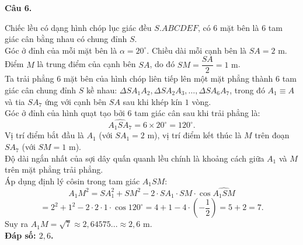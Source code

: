 \documentclass[12pt,a4paper]{article}
\newcommand{\loigiai}[1]{\par\medskip\Needspace{4\baselineskip}\noindent\textbf{#1}\par\nobreak}
\begin{document}
\loigiai{Câu 6.}
Chiếc lều có dạng hình chóp lục giác đều $S.ABCDEF$, có $6$ mặt bên là $6$ tam giác cân bằng nhau có chung đỉnh $S$.\\
Góc ở đỉnh của mỗi mặt bên là $\alpha = 20^\circ$. Chiều dài mỗi cạnh bên là $SA = 2\text{ m}$.\\
Điểm $M$ là trung điểm của cạnh bên $SA$, do đó $SM = \dfrac{SA}{2} = 1\text{ m}$.\\
Ta trải phẳng $6$ mặt bên của hình chóp liên tiếp lên một mặt phẳng thành $6$ tam giác cân chung đỉnh $S$ kề nhau: $\Delta S A_1 A_2, \Delta S A_2 A_3, \dots, \Delta S A_6 A_7$, trong đó $A_1 \equiv A$ và tia $S A_7$ ứng với cạnh bên $SA$ sau khi khép kín $1$ vòng.\\
Góc ở đỉnh của hình quạt tạo bởi $6$ tam giác cân sau khi trải phẳng là:
$$\widehat{A_1 S A_7} = 6 \times 20^\circ = 120^\circ.$$
Vị trí điểm bắt đầu là $A_1$ (với $SA_1 = 2\text{ m}$), vị trí điểm kết thúc là $M$ trên đoạn $SA_7$ (với $SM = 1\text{ m}$).\\
Độ dài ngắn nhất của sợi dây quấn quanh lều chính là khoảng cách giữa $A_1$ và $M$ trên mặt phẳng trải phẳng.\\
Áp dụng định lý côsin trong tam giác $A_1 S M$:
$$A_1 M^2 = SA_1^2 + SM^2 - 2 \cdot SA_1 \cdot SM \cdot \cos \widehat{A_1 S M}$$
$$= 2^2 + 1^2 - 2 \cdot 2 \cdot 1 \cdot \cos 120^\circ = 4 + 1 - 4 \cdot \left(-\dfrac{1}{2}\right) = 5 + 2 = 7.$$
Suy ra $A_1 M = \sqrt{7} \approx 2{,}64575... \approx 2{,}6\text{ m}$.\\
\textbf{Đáp số: $2{,}6$.}
\end{document}
